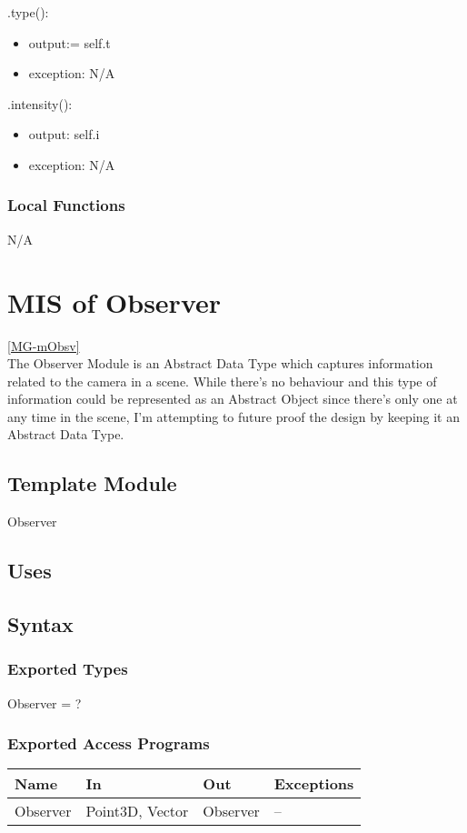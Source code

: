 \documentclass[12pt, titlepage]{article}
\begin{document}
\noindent .type():
\begin{itemize}
	\item output:= self.t
	\item exception: N/A
\end{itemize}

\noindent .intensity():
\begin{itemize}
	\item output: self.i
	\item exception: N/A
\end{itemize}

\subsubsection{Local Functions}
N/A

\newpage

\section{MIS of Observer} \ref{MG-mObsv} \\
The Observer Module is an Abstract Data Type which captures information related 
to the camera in a scene. While there's no behaviour and this type of 
information could be represented as an Abstract Object since there's only one 
at any time in the scene, I'm attempting to future proof the design by keeping 
it an Abstract Data Type.

\subsection{Template Module}
Observer

\subsection{Uses}

\subsection{Syntax}
\subsubsection{Exported Types}
Observer = ?
\subsubsection{Exported Access Programs}
\begin{center}
	\begin{tabular}{p{3cm} p{4cm} p{2cm} p{4cm}}
		\hline
		\textbf{Name} & \textbf{In} & \textbf{Out} & \textbf{Exceptions} \\
		\hline
		Observer & Point3D, Vector & Observer & -- \\
		\hline
	\end{tabular}
\end{center}
\end{document}
